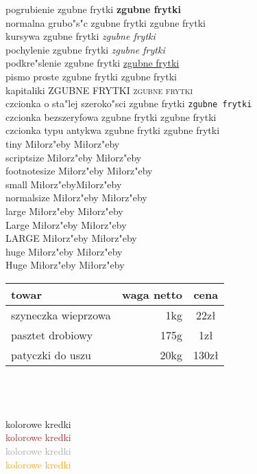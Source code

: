 \documentclass[12pt,twoside,a4paper]{article}
\begin{document}
pogrubienie \textbf{} zgubne frytki \textbf{zgubne frytki}\\
normalna grubo"s"c \textmd{} zgubne frytki \textmd{zgubne frytki}\\
kursywa \textit{} zgubne frytki \textit{zgubne frytki}\\
pochylenie \textsl{} zgubne frytki \textsl{zgubne frytki}\\
podkre"slenie  \underline{} zgubne frytki \underline{zgubne frytki}\\
pismo proste \textup{} zgubne frytki \textup{zgubne frytki}\\
kapitaliki \textsc{} ZGUBNE FRYTKI \textsc{zgubne frytki}\\
czcionka o sta"lej szeroko"sci \texttt{} zgubne frytki \texttt{zgubne frytki}\\
czcionka bezszeryfowa \textsf{} zgubne frytki \textsf{zgubne frytki}\\
czcionka typu antykwa \textrm{} zgubne frytki \textrm{zgubne frytki}\\

tiny Miłorz"eby \tiny{Miłorz"eby}\\
scriptsize Miłorz"eby \scriptsize{Miłorz"eby}\\
footnotesize Miłorz"eby \footnotesize{Miłorz"eby}\\
small Miłorz"eby\small{Miłorz"eby}\\
normalsize Miłorz"eby \normalsize{Miłorz"eby}\\
large Miłorz"eby \large{Miłorz"eby}\\
Large Miłorz"eby \Large{Miłorz"eby}\\
LARGE Miłorz"eby \LARGE{Miłorz"eby}\\
huge Miłorz"eby \huge{Miłorz"eby}\\
Huge Miłorz"eby \Huge{Miłorz"eby}\\


\begin{tabular}{lr|c}
towar & waga netto & cena\\\hline
szyneczka wieprzowa & 1kg & 22zł\\
pasztet drobiowy & 175g & 1zł\\
patyczki do uszu & 20kg & 130zł
\end{tabular}
\\
\\
\\

\textcolor[RGB]{255,214,76}{kolorowe kredki}\\
\textcolor{brown}{kolorowe kredki}\\
\textcolor{darkgray}{kolorowe kredki}\\
\textcolor{orange}{kolorowe kredki}\\
\end{document}
